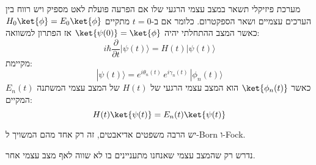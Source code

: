 \documentclass{tstextbook}
\begin{document}
\begin{proposition}
מערכת פיזיקלי תשאר במצב עצמי הרגעי שלו אם הפרעה פועלת לאט מספיק ויש רווח בין הערכים עצמיים ושאר הספקטרום.
כלומר אם ב-\(t=0\) מתקיים \(H_{0}\ket{\phi}=E_{0}\ket{\phi}\) כאשר המצב ההתחלתי יהיה \(\ket{\psi(0)}=\ket{\phi}\) אז הפתרון למשוואה:
$$i\hbar{\frac{\partial}{\partial t}}|\psi(t)\rangle=H(t)|\psi(t)\rangle$$
מקיימת:
$$|\psi(t)\rangle=e^{i\theta_{n}(t)}\,e^{i\gamma_{n}(t)}\,|\phi_{n}(t)\rangle$$
כאשר \(\ket{\phi_{n}(t)}\) הוא המצב עצמי הרגעי של \(H(t)\) של המצב עצמי המשתנה \(E_{n}(t)\) המקיים:
$$H(t)\ket{\psi(t)} =E_{n}(t)\ket{\psi(t)} $$

\end{proposition}
\begin{remark}
יש הרבה משפטים אדיאבטים, זה רק אחד מהם המשויך ל-Born ו-Fock. 

\end{remark}
\begin{remark}
נדרש רק שהמצב עצמי שאנחנו מתעניינים בו לא שווה לאף מצב עצמי אחר.

\end{remark}
\end{document}
